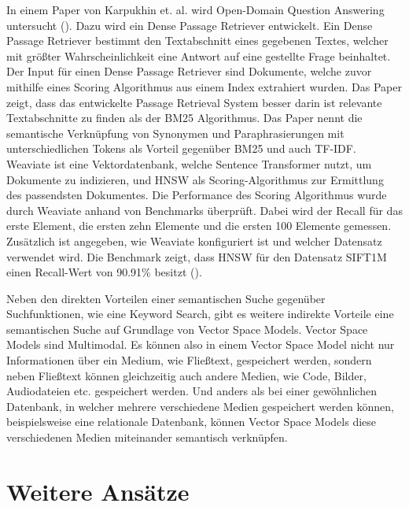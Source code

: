 In einem Paper von Karpukhin et. al. wird Open-Domain Question Answering untersucht (\cite{Karpukhin_Oguz_Min_Lewis_Wu_Edunov_Chen_Yih_2020}).
Dazu wird ein Dense Passage Retriever entwickelt.
Ein Dense Passage Retriever bestimmt den Textabschnitt eines gegebenen Textes, welcher mit größter Wahrscheinlichkeit eine Antwort auf eine gestellte Frage beinhaltet.
Der Input für einen Dense Passage Retriever sind Dokumente, welche zuvor mithilfe eines Scoring Algorithmus aus einem Index extrahiert wurden.
Das Paper zeigt, dass das entwickelte Passage Retrieval System besser darin ist relevante Textabschnitte zu finden als der BM25 Algorithmus. 
Das Paper nennt die semantische Verknüpfung von Synonymen und Paraphrasierungen mit unterschiedlichen Tokens als Vorteil gegenüber BM25 und auch TF-IDF.\\


Weaviate ist eine Vektordatenbank, welche Sentence Transformer nutzt, um Dokumente zu indizieren, und HNSW als Scoring-Algorithmus zur Ermittlung des passendsten Dokumentes.
Die Performance des Scoring Algorithmus wurde durch Weaviate anhand von Benchmarks überprüft.
Dabei wird der Recall für das erste Element, die ersten zehn Elemente und die ersten 100 Elemente gemessen.
Zusätzlich ist angegeben, wie Weaviate konfiguriert ist und welcher Datensatz verwendet wird.
Die Benchmark zeigt, dass HNSW für den Datensatz SIFT1M einen Recall-Wert von 90.91\% besitzt (\cite{Weaviate_Benchmark}).

Neben den direkten Vorteilen einer semantischen Suche gegenüber Suchfunktionen, wie eine Keyword Search, gibt es weitere indirekte Vorteile eine semantischen Suche auf Grundlage von Vector Space Models.
Vector Space Models sind Multimodal.
Es können also in einem Vector Space Model nicht nur Informationen über ein Medium, wie Fließtext, gespeichert werden, sondern neben Fließtext können gleichzeitig auch andere Medien, wie Code, Bilder, Audiodateien etc. gespeichert werden.
Und anders als bei einer gewöhnlichen Datenbank, in welcher mehrere verschiedene Medien gespeichert werden können, beispielsweise eine relationale Datenbank, können Vector Space Models diese verschiedenen Medien miteinander semantisch verknüpfen.\\

\section{Weitere Ansätze}

